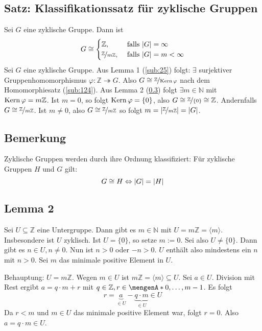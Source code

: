 \subsection{Satz: Klassifikationssatz für zyklische Gruppen} %
\label{sub:26}
Sei $G$ eine zyklische Gruppe. Dann ist 
\[
	G \cong \begin{cases}
		\mathds{Z}, &\text{ falls } \abs{G}= \infty \\
		\nicefrac{\mathds{Z}}{m \mathds{Z}}, &\text{ falls } \abs{G}=m < \infty
	\end{cases}
\]
Sei $G$ eine zyklische Gruppe. Aus Lemma 1 (\ref{sub:25}) folgt: $\exists$ surjektiver Gruppenhomomorphismus $\varphi : \mathds{Z} \twoheadrightarrow G$. Also $G \cong \nicefrac{\mathds{Z}}{\Kern \varphi}$ nach dem Homomorphiesatz (\ref{sub:124}). Aus Lemma 2 (\ref{sub:28}) folgt $\exists m \in \mathds{N}$ mit $\Kern \varphi = m \mathds{Z}$. Ist $m=0$, so folgt
$\Kern \varphi  =\{0\}$, also $G \cong \nicefrac{\mathds{Z}}{\{0\}} \cong \mathds{Z}$. Andernfalls $G \cong \nicefrac{\mathds{Z}}{m \mathds{Z}}$. Ist $m\not= 0$, also 
$ G \cong \nicefrac{\mathds{Z}}{m \mathds{Z}}$ so folgt $m= \abs{\nicefrac{\mathds{Z}}{m \mathds{Z}}} = \abs{G}$. \bewende

\subsection[Bemerkung: Vergleich von zyklischen Gruppen über die Ordnung]{Bemerkung} %
\label{sub:27}
Zyklische Gruppen werden durch ihre Ordnung klassifiziert: Für zyklische Gruppen $H$ und $G$ gilt: 
\[
	G \cong H \Leftrightarrow \abs{G}= \abs{H}  
\]

\subsection[Lemma 2: Jede Untergruppe von $\mathds{Z}$ ist zyklisch]{Lemma 2} %
\label{sub:28}
Sei $U \subseteq  \mathds{Z}$ eine Untergruppe. Dann gibt es $m \in \mathds{N}$ mit $U = m \mathds{Z} = \langle m\rangle$. Insbesondere ist $U$ zyklisch.
Ist $U= \{0\}$, so setze $m := 0$. Sei also $U \not= \{0\}$. Dann gibt es $n \in U, n \not= 0$. Nun ist $n>0$ oder $-n>0$. $U$ enthält also mindestens ein $n$ mit $n>0$. 
Sei $m$ das minimale positive Element in $U$. 

Behauptung: $U= m \mathds{Z}$. Wegen $m \in U$ ist $m \mathds{Z}= \langle m\rangle \subseteq U$. Sei $a \in U$. Division mit Rest ergibt $a= q \cdot m + r$ mit 
$q \in \mathds{Z}, r \in \set{0, \ldots , m-1} $. Es folgt 
\[
	r= \underbrace{a}_{\in U}- \underbrace{q \cdot m}_{\in U} \in U
\]
Da $r < m$ und $m \in U$ das minimale positive Element war, folgt $r=0$. Also $a= q \cdot m \in U$. \bewende


